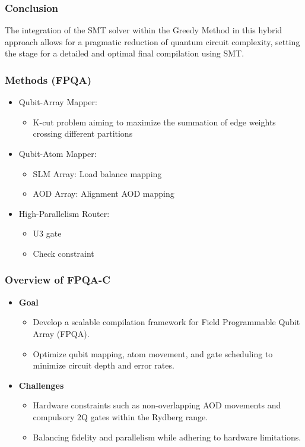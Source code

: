 \documentclass[18 pt]{beamer}
\begin{document}
\begin{frame}
    \frametitle{Conclusion}
    The integration of the SMT solver within the Greedy Method in this hybrid approach allows for a pragmatic reduction of quantum circuit complexity, setting the stage for a detailed and optimal final compilation using SMT.
\end{frame}

\begin{frame}
    \frametitle{Methods (FPQA)}
    \begin{itemize}
        \item Qubit-Array Mapper:
        \begin{itemize}
            \item K-cut problem aiming to maximize the summation of edge weights crossing different partitions
        \end{itemize}
        \item Qubit-Atom Mapper:
        \begin{itemize}
            \item SLM Array: Load balance mapping
            \item AOD Array: Alignment AOD mapping
        \end{itemize}
        \item High-Parallelism Router:
        \begin{itemize}
            \item U3 gate
            \item Check constraint
        \end{itemize}
    \end{itemize}
\end{frame}

\begin{frame}
    \frametitle{Overview of FPQA-C}
    \begin{itemize}
        \item \textbf{Goal}
        \begin{itemize}
            \item Develop a scalable compilation framework for Field Programmable Qubit Array (FPQA).
            \item Optimize qubit mapping, atom movement, and gate scheduling to minimize circuit depth and error rates.
        \end{itemize}
        \item \textbf{Challenges}
        \begin{itemize}
            \item Hardware constraints such as non-overlapping AOD movements and compulsory 2Q gates within the Rydberg range.
            \item Balancing fidelity and parallelism while adhering to hardware limitations.
        \end{itemize}
    \end{itemize}
\end{frame}
\end{document}
